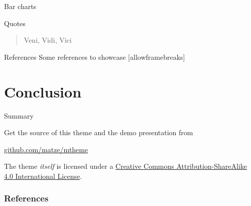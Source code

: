 \documentclass[10pt,pdf,utf8,russian,aspectratio=169]{beamer}
\begin{document}
\begin{frame}{Bar charts}
  \begin{figure}
  \end{figure}
\end{frame}
\begin{frame}{Quotes}
  \begin{quote}
    Veni, Vidi, Vici
  \end{quote}
\end{frame}

\begin{frame}{References}
  Some references to showcase [allowframebreaks] \cite{knuth92,ConcreteMath,Simpson,Er01,greenwade93}
\end{frame}

\section{Conclusion}

\begin{frame}{Summary}

  Get the source of this theme and the demo presentation from

  \begin{center}\url{github.com/matze/mtheme}\end{center}

  The theme \emph{itself} is licensed under a
  \href{http://creativecommons.org/licenses/by-sa/4.0/}{Creative Commons
  Attribution-ShareAlike 4.0 International License}.

  \begin{center}\ccbysa\end{center}

\end{frame}


\begin{frame}[allowframebreaks]

  \frametitle{References}

  
  

\end{frame}
\end{document}
